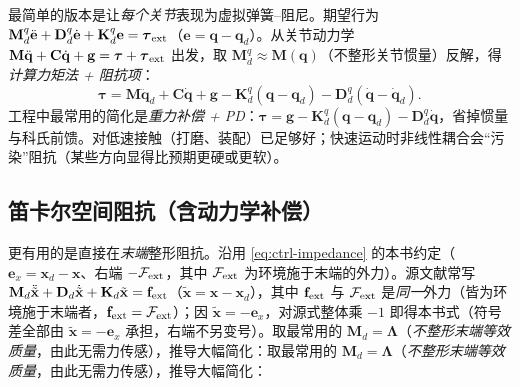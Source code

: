 最简单的版本是让\emph{每个关节}表现为虚拟弹簧--阻尼。期望行为 $\mathbf{M}_d^q\ddot{\mathbf{e}}+\mathbf{D}_d^q\dot{\mathbf{e}}+\mathbf{K}_d^q\mathbf{e}=\boldsymbol{\tau}_{\rm ext}$（$\mathbf{e}=\mathbf{q}-\mathbf{q}_d$）。从关节动力学 $\mathbf{M}\ddot{\mathbf{q}}+\mathbf{C}\dot{\mathbf{q}}+\mathbf{g}=\boldsymbol{\tau}+\boldsymbol{\tau}_{\rm ext}$ 出发，取 $\mathbf{M}_d^q\approx\mathbf{M}(\mathbf{q})$（不整形关节惯量）反解，得\emph{计算力矩法 + 阻抗项}：
\begin{equation}
  \boldsymbol{\tau}=\mathbf{M}\ddot{\mathbf{q}}_d+\mathbf{C}\dot{\mathbf{q}}+\mathbf{g}-\mathbf{K}_d^q(\mathbf{q}-\mathbf{q}_d)-\mathbf{D}_d^q(\dot{\mathbf{q}}-\dot{\mathbf{q}}_d).
  \label{eq:fw-imp-joint}
\end{equation}
工程中最常用的简化是\emph{重力补偿 + PD}：$\boldsymbol{\tau}=\mathbf{g}-\mathbf{K}_d^q(\mathbf{q}-\mathbf{q}_d)-\mathbf{D}_d^q\dot{\mathbf{q}}$，省掉惯量与科氏前馈。对低速接触（打磨、装配）已足够好；快速运动时非线性耦合会“污染”阻抗（某些方向显得比预期更硬或更软）。

\subsection{笛卡尔空间阻抗（含动力学补偿）}
\label{sec:fw-impedance-cart}

更有用的是直接在\emph{末端}整形阻抗。沿用 \cref{eq:ctrl-impedance} 的本书约定（$\mathbf{e}_x=\mathbf{x}_d-\mathbf{x}$、右端 $-\mathcal{F}_{\rm ext}$，其中 $\mathcal{F}_{\rm ext}$ 为环境施于末端的外力）。源文献常写 $\mathbf{M}_d\ddot{\tilde{\mathbf{x}}}+\mathbf{D}_d\dot{\tilde{\mathbf{x}}}+\mathbf{K}_d\tilde{\mathbf{x}}=\mathbf{f}_{\rm ext}$（$\tilde{\mathbf{x}}=\mathbf{x}-\mathbf{x}_d$），其中 $\mathbf{f}_{\rm ext}$ 与 $\mathcal{F}_{\rm ext}$ 是\emph{同一}外力（皆为环境施于末端者，$\mathbf{f}_{\rm ext}=\mathcal{F}_{\rm ext}$）；因 $\tilde{\mathbf{x}}=-\mathbf{e}_x$，对源式整体乘 $-1$ 即得本书式（符号差全部由 $\tilde{\mathbf{x}}=-\mathbf{e}_x$ 承担，右端不另变号）。取最常用的 $\mathbf{M}_d=\boldsymbol{\Lambda}$（\emph{不整形末端等效质量}，由此无需力传感），推导大幅简化：取最常用的 $\mathbf{M}_d=\boldsymbol{\Lambda}$（\emph{不整形末端等效质量}，由此无需力传感），推导大幅简化：

